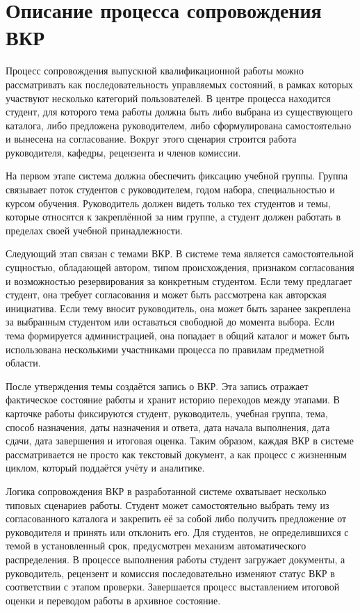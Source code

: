 \documentclass[14pt,a4paper]{extreport}
\begin{document}
\section{Описание процесса сопровождения ВКР}

Процесс сопровождения выпускной квалификационной работы можно
рассматривать как последовательность управляемых состояний, в рамках
которых участвуют несколько категорий пользователей.
В центре процесса находится студент, для которого тема работы должна быть
либо выбрана из существующего каталога, либо предложена руководителем,
либо сформулирована самостоятельно и вынесена на согласование.
Вокруг этого сценария строится работа руководителя, кафедры, рецензента и
членов комиссии.

На первом этапе система должна обеспечить фиксацию учебной группы.
Группа связывает поток студентов с руководителем, годом набора,
специальностью и курсом обучения.
Руководитель должен видеть только тех студентов и темы, которые относятся
к закреплённой за ним группе, а студент должен работать в пределах своей
учебной принадлежности.

Следующий этап связан с темами ВКР.
В системе тема является самостоятельной сущностью, обладающей автором,
типом происхождения, признаком согласования и возможностью резервирования
за конкретным студентом.
Если тему предлагает студент, она требует согласования и может быть
рассмотрена как авторская инициатива.
Если тему вносит руководитель, она может быть заранее закреплена за
выбранным студентом или оставаться свободной до момента выбора.
Если тема формируется администрацией, она попадает в общий каталог и может
быть использована несколькими участниками процесса по правилам предметной
области.

После утверждения темы создаётся запись о ВКР.
Эта запись отражает фактическое состояние работы и хранит историю
переходов между этапами.
В карточке работы фиксируются студент, руководитель, учебная группа, тема,
способ назначения, даты назначения и ответа, дата начала выполнения, дата
сдачи, дата завершения и итоговая оценка.
Таким образом, каждая ВКР в системе рассматривается не просто как текстовый
документ, а как процесс с жизненным циклом, который поддаётся учёту и
аналитике.

Логика сопровождения ВКР в разработанной системе охватывает несколько типовых
сценариев работы. Студент может самостоятельно выбрать тему из согласованного
каталога и закрепить её за собой либо получить предложение от руководителя и
принять или отклонить его. Для студентов, не определившихся с темой в
установленный срок, предусмотрен механизм автоматического распределения.
В процессе выполнения работы студент загружает документы, а руководитель,
рецензент и комиссия последовательно изменяют статус ВКР в соответствии с
этапом проверки. Завершается процесс выставлением итоговой оценки и переводом
работы в архивное состояние.
\end{document}
